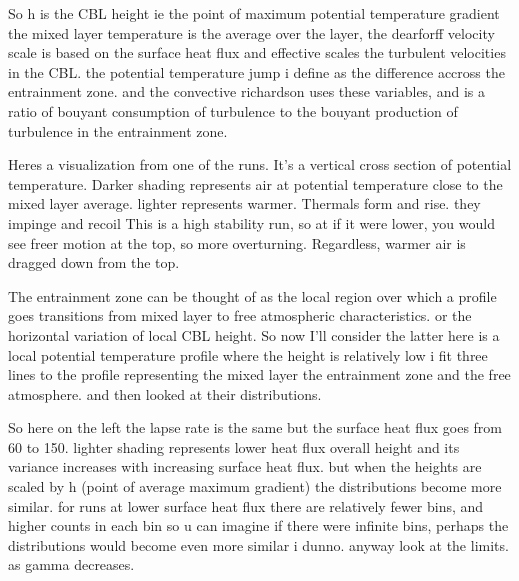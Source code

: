 \documentclass{beamer}
\begin{document}
\begin{frame}
So h is the CBL height ie the point of maximum potential temperature gradient the mixed layer temperature is the average over the layer, the dearforff velocity scale is based on the surface heat flux and effective scales the turbulent velocities in the CBL.  the potential temperature jump i define as the difference accross the entrainment zone.  and the convective richardson uses these variables, and is a ratio of bouyant consumption of turbulence to the bouyant production of turbulence in the entrainment zone.

\end{frame}

\begin{frame}
Heres a visualization from one of the runs.  It's a vertical cross section of potential temperature.  Darker shading represents air at potential temperature close to the mixed layer average.  lighter represents warmer.  Thermals form and rise.  they impinge and recoil This is a high stability run, so at if it were lower, you would see freer motion at the top, so more overturning.  Regardless, warmer air is dragged down from the top.\\

\end{frame}

\begin{frame}
The entrainment zone can be thought of as the local region over which a profile goes transitions from mixed layer to free atmospheric characteristics. or the horizontal variation of local CBL height.  So now I'll consider the latter here is a local potential temperature profile where the height is relatively low i fit three lines to the profile representing the mixed layer the entrainment zone and the free atmosphere.  and then looked at their distributions.\\
\end{frame}

\begin{frame}
So here on the left the lapse rate is the same but the surface heat flux goes from 60 to 150.  lighter shading represents lower heat flux overall height and its variance increases with increasing surface heat flux. but when the heights are scaled by h (point of average maximum gradient) the distributions become more similar.  for runs at lower surface heat flux there are relatively fewer bins, and higher counts in each bin so u can imagine if there were infinite bins, perhaps the distributions would become even more similar i dunno.  anyway look at the limits.  as gamma decreases.
\end{frame}
\end{document}
